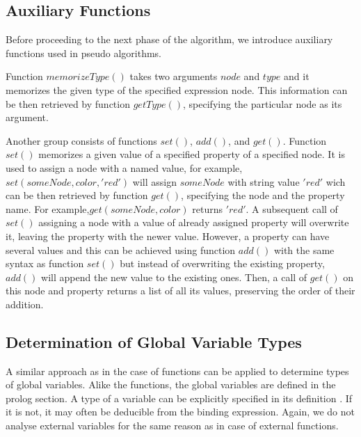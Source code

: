 \subsection{Auxiliary Functions}
Before proceeding to the next phase of the algorithm, we introduce auxiliary functions used in pseudo algorithms.

Function $memorizeType()$ takes two arguments $node$ and $type$ and it memorizes the given type of the specified expression node. This information can be then retrieved by function $getType()$, specifying the particular node as its argument.

Another group consists of functions $set()$, $add()$, and $get()$. Function $set()$ memorizes a given value of a specified property of a specified node. It is used to assign a node with a named value, for example, $set(someNode, color, 'red')$ will assign $someNode$ with string value $'red'$ wich can be then retrieved by function $get()$, specifying the node and the property name. For example,\linebreak $get(someNode, color)$ returns $'red'$. A subsequent call of $set()$ assigning a node with a value of already assigned property will overwrite it, leaving the property with the newer value. However, a property can have several values and this can be achieved using function $add()$ with the same syntax as function $set()$ but instead of overwriting the existing property, $add()$ will append the new value to the existing ones. Then, a call of $get()$ on this node and property returns a list of all its values, preserving the order of their addition.

\subsection{Determination of Global Variable Types}
A similar approach as in the case of functions can be applied to determine types of global variables. Alike the functions, the global variables are defined in the prolog section. A type of a variable can be explicitly specified in its definition . If it is not, it may often be deducible from the binding expression. Again, we do not analyse external variables for the same reason as in case of external functions.


